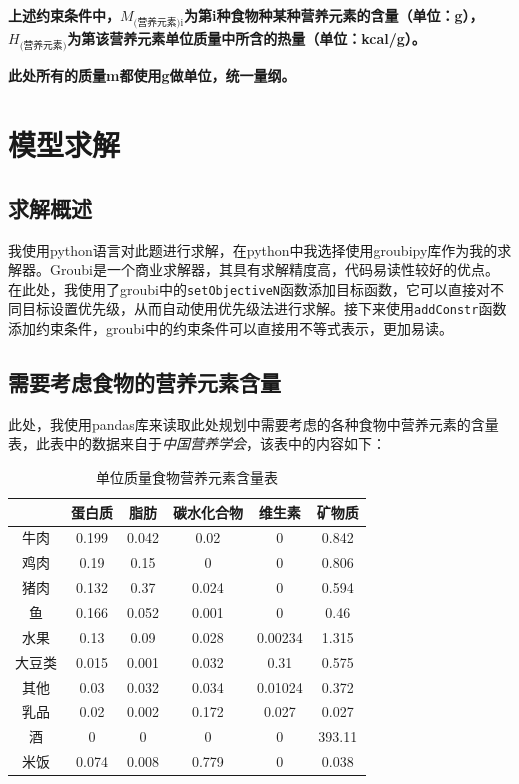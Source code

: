 \documentclass{SYSUReport}
\begin{document}
\textbf{上述约束条件中，$M_\text{(营养元素)i}$为第i种食物种某种营养元素的含量（单位：g），$H_\text{(营养元素)}$为第该营养元素单位质量中所含的热量（单位：kcal/g）。}

\textbf{此处所有的质量m都使用g做单位，统一量纲。}

\section{模型求解}
\subsection{求解概述}
我使用python语言对此题进行求解，在python中我选择使用groubipy库作为我的求解器。Groubi\cite{gurobi_zhihu}是一个商业求解器，其具有求解精度高，代码易读性较好的优点。在此处，我使用了groubi中的\texttt{setObjectiveN}函数添加目标函数，它可以直接对不同目标设置优先级，从而自动使用优先级法进行求解。接下来使用\texttt{addConstr}函数添加约束条件，groubi中的约束条件可以直接用不等式表示，更加易读。

\subsection{需要考虑食物的营养元素含量}
此处，我使用pandas库来读取此处规划中需要考虑的各种食物中营养元素的含量表，此表中的数据来自于\textit{中国营养学会}\cite{china_nutrition_society}，该表中的内容如下：

\begin{table}[h!]
\centering
\renewcommand\arraystretch{0.65}
\begin{tabular}{cccccc}
\toprule
\quad & 蛋白质 & 脂肪 & 碳水化合物 & 维生素 & 矿物质 \\
\midrule
牛肉 & 0.199 & 0.042 & 0.02 & 0 & 0.842 \\
鸡肉 & 0.19 & 0.15 & 0 & 0 & 0.806 \\
猪肉 & 0.132 & 0.37 & 0.024 & 0 & 0.594 \\
鱼 & 0.166 & 0.052 & 0.001 & 0 & 0.46 \\
水果 & 0.13 & 0.09 & 0.028 & 0.00234 & 1.315 \\
大豆类 & 0.015 & 0.001 & 0.032 & 0.31 & 0.575 \\
其他 & 0.03 & 0.032 & 0.034 & 0.01024 & 0.372 \\
乳品 & 0.02 & 0.002 & 0.172 & 0.027 & 0.027 \\
酒 & 0 & 0 & 0 & 0 & 393.11 \\
米饭 & 0.074 & 0.008 & 0.779 & 0 & 0.038 \\
\bottomrule
\end{tabular}
\caption{单位质量食物营养元素含量表}
\label{table:nutrient_intake}
\end{table}
\end{document}
